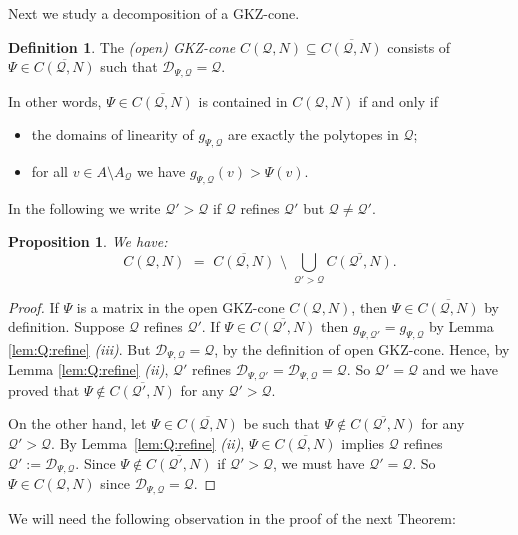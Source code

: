 \documentclass[12pt, a4article]{amsart}   	%
\numberwithin{equation}{section}
\theoremstyle{plain}
\newtheorem{proposition}[theorem]{Proposition}
\theoremstyle{definition}
\newtheorem{definition}[theorem]{Definition}
\newcommand{\mcD}{{\mathcal D}}
\newcommand{\mcQ}{{\mathcal Q}}
\begin{document}
Next we study a decomposition of a GKZ-cone.

\begin{definition}\label{def:gkz:open:cone}
    The \emph{(open) GKZ-cone} $C(\mcQ,N)\subseteq \overline{C(\mcQ,N)}$ consists of $\Psi\in\overline{C(\mcQ,N)}$ such that $\mcD_{\Psi,\mcQ} = \mcQ$. 
\end{definition}

In other words, $\Psi\in \overline{C(\mcQ,N)}$ is contained in $C(\mcQ,N)$ if and only if 
    \begin{itemize}
        \item[(1)] the domains of linearity of $g_{\Psi,\mcQ}$ are exactly the polytopes in $\mcQ$;
        \item[(2)] for all $v\in A\setminus A_\mcQ$ we have $g_{\Psi,\mcQ}(v) > \Psi(v)$.
    \end{itemize}

In the following we write $\mcQ'>\mcQ$ if $\mcQ$ refines $\mcQ'$ but $\mcQ\not =\mcQ'$.

\begin{proposition}\label{prp:gkz:open:closed}
We have:
    \[
    C(\mcQ,N) \,\, = \,\, \overline{C(\mcQ,N)}\,\,\setminus\,\,\bigcup_{\mcQ'>\mcQ}\overline{C(\mcQ',N)}.
    \]
\end{proposition}

\begin{proof}
If $\Psi$ is a matrix in the open GKZ-cone $C(\mcQ,N)$, then $\Psi\in\overline{C(\mcQ,N)}$ by definition. Suppose $\mcQ$ refines $\mcQ'$. If $\Psi\in\overline{C(\mcQ',N)}$ then $g_{\Psi,\mcQ'} = g_{\Psi,\mcQ}$ by Lemma \ref{lem:Q:refine} \emph{(iii)}. But $\mcD_{\Psi,\mcQ} = \mcQ$, by the definition of open GKZ-cone. Hence, by Lemma \ref{lem:Q:refine} \emph{(ii)}, $\mcQ'$ refines $\mcD_{\Psi,\mcQ'} = \mcD_{\Psi,\mcQ} = \mcQ$. So $\mcQ' = \mcQ$ and we have proved that $\Psi\not\in\overline{C(\mcQ',N)}$ for any $\mcQ'>\mcQ$.

On the other hand, let $\Psi\in\overline{C(\mcQ,N)}$ be such that $\Psi\notin\overline{C(\mcQ',N)}$ for any $\mcQ'>\mcQ$. 
By Lemma~\ref{lem:Q:refine} \emph{(ii)},  $\Psi\in\overline{C(\mcQ,N)}$ implies $\mcQ$ refines $\mcQ':=\mcD_{\Psi,\mcQ}$. 
Since $\Psi\notin\overline{C(\mcQ',N)}$ if $\mcQ'>\mcQ$, we must have 
$\mcQ' = \mcQ$. So $\Psi\in C(\mcQ,N)$ since $\mcD_{\Psi,\mcQ} = \mcQ$.
\end{proof}

We will need the following observation in the proof of the next Theorem:
\end{document}
